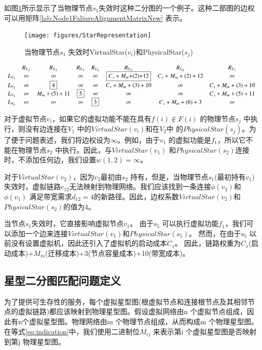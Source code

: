 如图\ref{fig:StarRepresentation}所示显示了当物理节点$s_1$失效时这种二分图的一个例子。这种二部图的边权可以用矩阵\ref{lab:Node1FaliureAlignmentMatrixNew} 表示。
\begin{figure}
\centering
\texttt{[image: figures/StarRepresentation]}\\
  \caption{当物理节点$s_1$ 失效时VirtualStar($v_i$)和PhysicalStar($s_j$)}\label{fig:StarRepresentation}
\end{figure}

\begin{equation*}
\small{
 {\begin{array}{*{20}{c}}
&R_{S_{1}}&R_{S_{2}}&R_{S_3}&R_{S_4}&R_{S_5}&R_{S_6}&R_{S_{7}}\\
{L_{V_1}}&\infty&\infty&\infty&\infty&\fbox{$C_{s}+M_{m}$+(2)+12}&C_{s}+M_{m}+(2)+12&\infty\\
L_{V_2}&\infty&\fbox{4}&\infty&\infty&C_{s}+M_{m}+(3)+10&\infty&C_{s}+M_{m}+(3)+10\\
L_{V_3}&\infty&M_{m}+(5)+11&\fbox{5}&\infty&\infty&\infty&C_{s}+M_{m}+(5)+11\\
L_{V_4}&\infty&\infty&\infty&\fbox{3}&\infty&C_{s}+M_{m}+(6)+3&\infty\\
\end{array}}
}
\label{lab:Node1FaliureAlignmentMatrixNew}
\end{equation*}


对于虚拟节点$v_i$，如果它的虚拟功能不能在具有$f(i) \notin F(i)$ 的物理节点$s_j$ 中执行，则没有边连接在$V_1$ 中的$VirtualStar(v_i)$和在$V_2$中 的$PhysicalStar(s_j)$。为了便于问题表述，我们将边权设为$\infty $。例如，由于$v_1$ 的虚拟功能是$f_1$，所以它不能在物理节点$s_2$ 中执行。因此，与$VirtualStar(v_1)$ 和$PhysicalStar(s_2)$连接时，不添加任何边，我们设置$w(1,2)=\infty$。

对于$VirtualStar(v_2)$，因为$v_2$最初由$s_2$ 持有，但是，当物理节点$s_1$(最初持有$v_1$)失效时，虚拟链路$e_{12}$无法映射到物理网络。我们应该找到一条连接$\phi(v_2)$和$\phi(v_1)$ 满足带宽需求$d_{12}=4$的新路径。因此，边权系数$VirtualStar(v_2)$和$PhysicalStar(s_2)$的值为4。

当节点$s_1$失效时，它直接影响虚拟节点$v_1$。 由于$s_5$ 可以执行虚拟功能$f_1$，我们可以添加一个边来连接$VirtualStar(v_1)$和$PhysicalStar(s_5)$。 然而，在由于$s_5$ 以前没有设置虚拟机，因此还引入了虚拟机的启动成本$C_s$。 因此，链路权重为$C_s$(启动成本)+$M_m$(迁移成本)+3(节点容量成本)+10(带宽成本)。

\subsection{星型二分图匹配问题定义}
为了提供可生存性的服务，每个虚拟星型图(根虚拟节点和连接根节点及其相邻节点的虚拟链路)都应该映射到物理星型图。假设虚拟网络由n 个虚拟节点组成，因此有n个虚拟星型图。物理网络由m 个物理节点组成，从而构成m 个物理星型图。在等式\ref{eq:indication}中，我们使用二进制位$M_{ij}$ 来表示第i 个虚拟星型图是否映射到第j 物理星型图。

